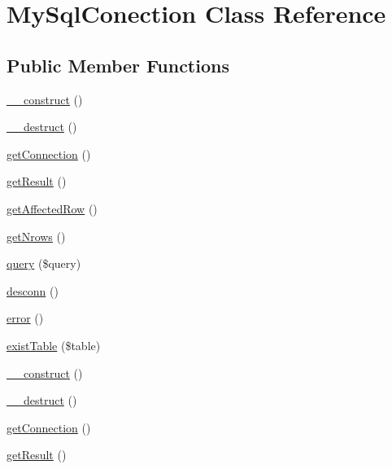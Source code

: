 \hypertarget{class_my_sql_conection}{}\section{My\+Sql\+Conection Class Reference}
\label{class_my_sql_conection}
\subsection*{Public Member Functions}
\begin{DoxyCompactItemize}
\item 
\mbox{\hyperlink{class_my_sql_conection_a095c5d389db211932136b53f25f39685}{\+\_\+\+\_\+construct}} ()
\item 
\mbox{\hyperlink{class_my_sql_conection_a421831a265621325e1fdd19aace0c758}{\+\_\+\+\_\+destruct}} ()
\item 
\mbox{\hyperlink{class_my_sql_conection_ab7a0a080d0e721c656eef11cd641638b}{get\+Connection}} ()
\item 
\mbox{\hyperlink{class_my_sql_conection_ae077eb8a032a325ceb939bfabfa5f472}{get\+Result}} ()
\item 
\mbox{\hyperlink{class_my_sql_conection_afe3a3e37406e9d83cc30c46d9eb770a9}{get\+Affected\+Row}} ()
\item 
\mbox{\hyperlink{class_my_sql_conection_a9b6d440558c6276d62ea45b6727a8b32}{get\+Nrows}} ()
\item 
\mbox{\hyperlink{class_my_sql_conection_ac9fddec3f6bd1db128887a1b211d90f0}{query}} (\$query)
\item 
\mbox{\hyperlink{class_my_sql_conection_a0a967d2f64e8c8ea51389e9dafb50d75}{desconn}} ()
\item 
\mbox{\hyperlink{class_my_sql_conection_a43b8d30b879d4f09ceb059b02af2bc02}{error}} ()
\item 
\mbox{\hyperlink{class_my_sql_conection_a421b3316d3ece1b6d8ba968488939ff9}{exist\+Table}} (\$table)
\item 
\mbox{\hyperlink{class_my_sql_conection_a095c5d389db211932136b53f25f39685}{\+\_\+\+\_\+construct}} ()
\item 
\mbox{\hyperlink{class_my_sql_conection_a421831a265621325e1fdd19aace0c758}{\+\_\+\+\_\+destruct}} ()
\item 
\mbox{\hyperlink{class_my_sql_conection_ab7a0a080d0e721c656eef11cd641638b}{get\+Connection}} ()
\item 
\mbox{\hyperlink{class_my_sql_conection_ae077eb8a032a325ceb939bfabfa5f472}{get\+Result}} ()
\item 

\end{DoxyCompactItemize}
